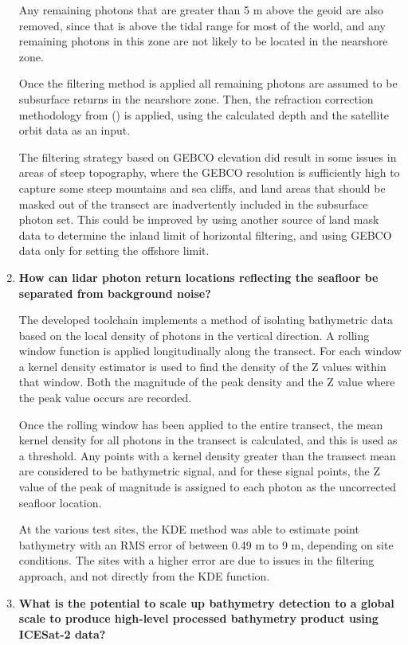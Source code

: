 \begin{enumerate}
    Any remaining photons that are greater than 5 m above the geoid are also removed, since that is above the tidal range for most of the world, and any remaining photons in this zone are not likely to be located in the nearshore zone. 

    Once the filtering method is applied all remaining photons are assumed to be subsurface returns in the nearshore zone. Then, the refraction correction methodology from \citeauthor{Parrish2019}(\citeyear{Parrish2019}) is applied, using the calculated depth and the satellite orbit data as an input. 

    The filtering strategy based on GEBCO elevation did result in some issues in areas of steep topography, where the GEBCO resolution is sufficiently high to capture some steep mountains and sea cliffs, and land areas that should be masked out of the transect are inadvertently included in the subsurface photon set. This could be improved by using another source of land mask data to determine the inland limit of  horizontal filtering, and using GEBCO data only for setting the offshore limit.

    \item \textbf{How can lidar photon return locations reflecting the seafloor be separated from background noise?}
    
    The developed toolchain implements a method of isolating bathymetric data based on the local density of photons in the vertical direction. A rolling window function is applied longitudinally along the transect. For each window a kernel density estimator is used to find the density of the Z values within that window. Both the magnitude of the peak density and the Z value where the peak value occurs are recorded.    
    
    Once the rolling window has been applied to the entire transect, the mean kernel density for all photons in the transect is calculated, and this is used as a threshold. Any points with a kernel density greater than the transect mean are considered to be bathymetric signal, and for these signal points, the Z value of the peak of magnitude is assigned to each photon as the uncorrected seafloor location. 
    
    At the various test sites, the KDE method was able to estimate point bathymetry with an RMS error of between 0.49 m to 9 m, depending on site conditions. The sites with a higher error are due to issues in the filtering approach, and not directly from the KDE function.
    \item \textbf{What is the potential to scale up bathymetry detection to a global scale to produce high-level processed bathymetry product using ICESat-2 data? } 
    

\end{enumerate}
